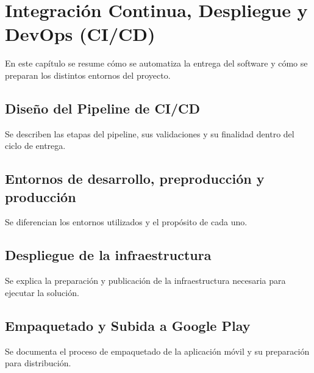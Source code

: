 \chapter{Integración Continua, Despliegue y DevOps (CI/CD)}
\label{cap:cicd}

En este capítulo se resume cómo se automatiza la entrega del software y cómo se preparan los distintos entornos del proyecto.

\section{Diseño del Pipeline de CI/CD}

Se describen las etapas del pipeline, sus validaciones y su finalidad dentro del ciclo de entrega.

\section{Entornos de desarrollo, preproducción y producción}

Se diferencian los entornos utilizados y el propósito de cada uno.

\section{Despliegue de la infraestructura}

Se explica la preparación y publicación de la infraestructura necesaria para ejecutar la solución.

\section{Empaquetado y Subida a Google Play}

Se documenta el proceso de empaquetado de la aplicación móvil y su preparación para distribución.